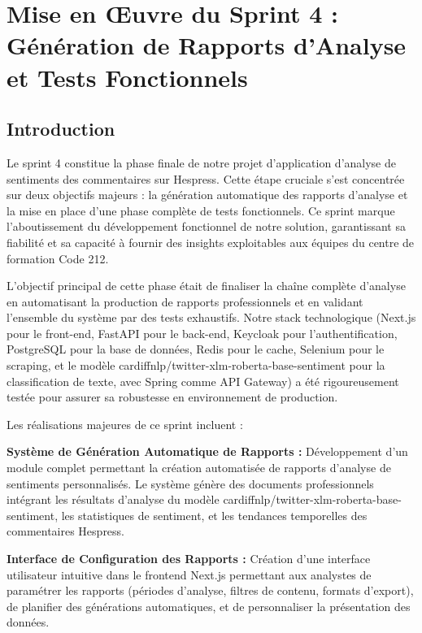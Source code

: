 \chapter{Mise en Œuvre du Sprint 4 : Génération de Rapports d'Analyse et Tests Fonctionnels}

\section{Introduction}

Le sprint 4 constitue la phase finale de notre projet d'application d'analyse de sentiments des commentaires sur Hespress. Cette étape cruciale s'est concentrée sur deux objectifs majeurs : la génération automatique des rapports d'analyse et la mise en place d'une phase complète de tests fonctionnels. Ce sprint marque l'aboutissement du développement fonctionnel de notre solution, garantissant sa fiabilité et sa capacité à fournir des insights exploitables aux équipes du centre de formation Code 212.

L'objectif principal de cette phase était de finaliser la chaîne complète d'analyse en automatisant la production de rapports professionnels et en validant l'ensemble du système par des tests exhaustifs. Notre stack technologique (Next.js pour le front-end, FastAPI pour le back-end, Keycloak pour l'authentification, PostgreSQL pour la base de données, Redis pour le cache, Selenium pour le scraping, et le modèle cardiffnlp/twitter-xlm-roberta-base-sentiment pour la classification de texte, avec Spring comme API Gateway) a été rigoureusement testée pour assurer sa robustesse en environnement de production.

Les réalisations majeures de ce sprint incluent :

\textbf{Système de Génération Automatique de Rapports :} Développement d'un module complet permettant la création automatisée de rapports d'analyse de sentiments personnalisés. Le système génère des documents professionnels intégrant les résultats d'analyse du modèle cardiffnlp/twitter-xlm-roberta-base-sentiment, les statistiques de sentiment, et les tendances temporelles des commentaires Hespress.

\textbf{Interface de Configuration des Rapports :} Création d'une interface utilisateur intuitive dans le frontend Next.js permettant aux analystes de paramétrer les rapports (périodes d'analyse, filtres de contenu, formats d'export), de planifier des générations automatiques, et de personnaliser la présentation des données.

